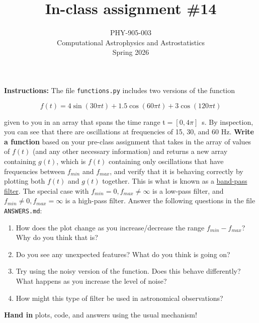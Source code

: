 \documentclass[10pt]{article}
\title{In-class assignment \#14}
\author{PHY-905-003\\Computational Astrophysics and
  Astrostatistics\\Spring 2026}
\date{} %
\begin{document}
 
\maketitle

\vspace{-5mm}


\noindent \textbf{Instructions:}   The file \texttt{functions.py}
includes two versions of the function

\begin{equation}
f(t) = 4 \sin(30 \pi t) + 1.5 \cos(60 \pi t) + 3 \cos(120 \pi t)
\end{equation}

\noindent
given to you in an array that spans the time range t$ = [0,4\pi]$~s.
By inspection, you can see that there are oscillations at frequencies
of 15, 30, and 60 Hz.  \textbf{Write a function} based on your
pre-class assignment that takes in the array of values of $f(t)$ (and
any other necessary information) and returns a new array containing
$g(t)$, which is $f(t)$ containing only oscillations that have
frequencies between $f_{min}$ and $f_{max}$, and verify that it is
behaving correctly by plotting both $f(t)$ and $g(t)$ together.  This
is what is known as a
\href{https://en.wikipedia.org/wiki/Band-pass_filter}{band-pass
filter}.  The special case with $f_{min} = 0, f_{max} \neq \infty$ is a low-pass filter,
and $f_{min}  \neq 0, f_{max} = \infty$ is a high-pass filter.  Answer the following
questions in the file \texttt{ANSWERS.md}:

\begin{enumerate}

\item How does the plot change as you increase/decrease the range
  $f_{min} - f_{max}$?  Why do you think that is?

\item Do you see any unexpected features?  What do you think is going
  on?

\item Try using the noisy version of the function.  Does this behave
  differently?  What happens as you increase the level of noise?

\item How might this type of filter be used in astronomical observations?

\end{enumerate}

\noindent
\textbf{Hand in} plots, code, and answers using the usual mechanism!
\end{document}
